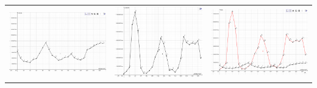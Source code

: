 \documentclass{report}
\begin{document}
\begin{table}[H]
	\centering
	\begin{tabular}{|l|l|l|}
		\hline
		\includegraphics[scale=0.133]{Bileter/Torsk.png} & \includegraphics[scale=0.133]{Bileter/Lodde.png} & \includegraphics[scale=0.133]{Bileter/loddeogtorsk.png} \\

\end{tabular}
\end{table}
\end{document}
